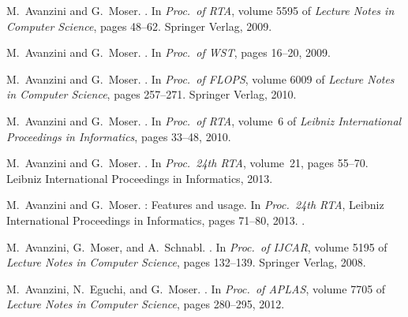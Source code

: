 \documentclass{LMCS}
\begin{document}
\begin{thebibliography}{59}
M.~Avanzini and G.~Moser.
.
\newblock In \emph{Proc.\ of  RTA}, volume 5595 of \emph{Lecture Notes
  in Computer Science}, pages 48--62. Springer Verlag, 2009{}.

M.~Avanzini and G.~Moser.
.
\newblock In \emph{Proc.\ of  WST}, pages 16--20, 2009{}.

M.~Avanzini and G.~Moser.
.
\newblock In \emph{Proc.\ of  FLOPS}, volume 6009 of \emph{Lecture
  Notes in Computer Science}, pages 257--271. Springer Verlag,
  2010{}.

M.~Avanzini and G.~Moser.
.
\newblock In \emph{Proc.\ of  RTA}, volume~6 of \emph{Leibniz
  International Proceedings in Informatics}, pages 33--48, 2010{}.

M.~Avanzini and G.~Moser.
.
\newblock In \emph{Proc.\ 24th RTA}, volume~21, pages 55--70. Leibniz
  International Proceedings in Informatics, 2013{}.

M.~Avanzini and G.~Moser.
: {F}eatures and usage.
\newblock In \emph{Proc.\ 24th RTA}, Leibniz International Proceedings in
  Informatics, pages 71--80, 2013{}.
.

M.~Avanzini, G.~Moser, and A.~Schnabl.
.
\newblock In \emph{Proc.\ of  IJCAR}, volume 5195 of \emph{Lecture Notes
  in Computer Science}, pages 132--139. Springer Verlag, 2008.

M.~Avanzini, N.~Eguchi, and G.~Moser.
.
\newblock In \emph{Proc.\ of  APLAS}, volume 7705 of \emph{Lecture
  Notes in Computer Science}, pages 280--295, 2012.


\end{thebibliography}
\end{document}
